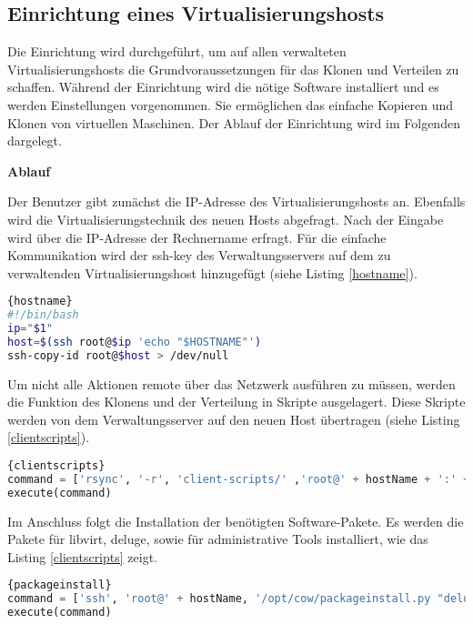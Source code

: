 \subsection{Einrichtung eines Virtualisierungshosts}\label{einrichtung}
Die Einrichtung wird durchgeführt, um auf allen verwalteten Virtualisierungshosts die Grundvoraussetzungen für das Klonen und Verteilen zu schaffen. Während der Einrichtung wird die nötige Software installiert und es werden Einstellungen vorgenommen. Sie ermöglichen das einfache Kopieren und Klonen von virtuellen Maschinen. Der Ablauf der Einrichtung wird im Folgenden dargelegt. 

\textbf{Ablauf}

Der Benutzer gibt zunächst die IP-Adresse des Virtualisierungshosts an. Ebenfalls wird die Virtualisierungstechnik des neuen Hosts abgefragt. Nach der Eingabe wird über die IP-Adresse der Rechnername erfragt. Für die einfache Kommunikation wird der ssh-key des Verwaltungsservers auf dem zu verwaltenden Virtualisierungshost hinzugefügt (siehe Listing \ref{hostname}).
\\
\begin{lstlisting}[caption=Abruf des Rechnernamens und Kopieren des ssh-keys (hostname.sh),language=Bash,label=hostname]{hostname}
#!/bin/bash
ip="$1"
host=$(ssh root@$ip 'echo "$HOSTNAME"')
ssh-copy-id root@$host > /dev/null
\end{lstlisting}

Um nicht alle Aktionen remote über das Netzwerk ausführen zu müssen, werden die Funktion des Klonens und der Verteilung in Skripte ausgelagert. Diese Skripte werden von dem Verwaltungsserver auf den neuen Host übertragen (siehe Listing \ref{clientscripts}).
\\
\begin{lstlisting}[caption=Übertragung der Client-Skripte,language=Python,label=clientscripts]{clientscripts}
command = ['rsync', '-r', 'client-scripts/' ,'root@' + hostName + ':' + binDir]
execute(command)
\end{lstlisting}

Im Anschluss folgt die Installation der benötigten Software-Pakete. Es werden die Pakete für libvirt, deluge, sowie für administrative Tools installiert, wie das Listing \ref{clientscripts} zeigt. 
\\
\begin{lstlisting}[caption=Paketinstallation auf dem Virtualisierungsserver,language=Python,label=packageinstall]{packageinstall}
command = ['ssh', 'root@' + hostName, '/opt/cow/packageinstall.py "deluged deluge-console mktorrent libvirt-bin python-libvirt"' ]
execute(command)
\end{lstlisting}

